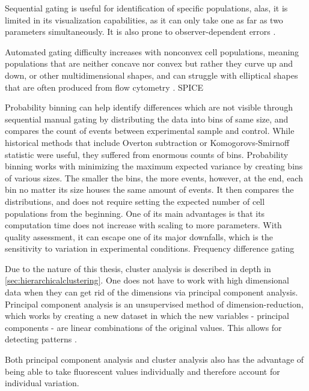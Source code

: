 Sequential gating is useful for identification of specific populations, alas, it is limited in its visualization capabilities, as it can only take one as far as two parameters simultaneously. It is also prone to observer-dependent errors \citep{herzenberg2006interpreting}.

Automated gating difficulty increases with nonconvex cell populations, meaning populations that are neither concave nor convex but rather they curve up and down, or other multidimensional shapes, and can struggle with elliptical shapes that are often produced from flow cytometry \cite{finak2009merging}.
SPICE

Probability binning can help identify differences which are not visible through sequential manual gating by distributing the data into bins of same size, and compares the count of events between experimental sample and control. While historical methods that include Overton subtraction \citep{overton1988modified} or Komogorovs-Smirnoff statistic \citep{young1977proof} were useful, they suffered from enormous counts of bins. Probability binning works with minimizing the maximum expected variance by creating bins of various sizes. The smaller the bins, the more events, however, at the end, each bin no matter its size houses the same amount of events. It then compares the distributions, and does not require setting the expected number of cell populations from the beginning. One of its main advantages is that its computation time does not increase with scaling to more parameters. With quality assessment, it can escape one of its major downfalls, which is the sensitivity to variation in experimental conditions.
Frequency difference gating

Due to the nature of this thesis, cluster analysis is described in depth in \ref{sec:hierarchicalclustering}. 
One does not have to work with high dimensional data when they can get rid of the dimensions via principal component analysis. Principal component analysis is an unsupervised method of dimension-reduction, which works by creating a new dataset in which the new variables - principal components - are linear combinations of the original values. This allows for detecting patterns \citep{rauber2021cerebrospinal}.

Both principal component analysis and cluster analysis also has the advantage of being able to take fluorescent values individually and therefore account for individual variation.



